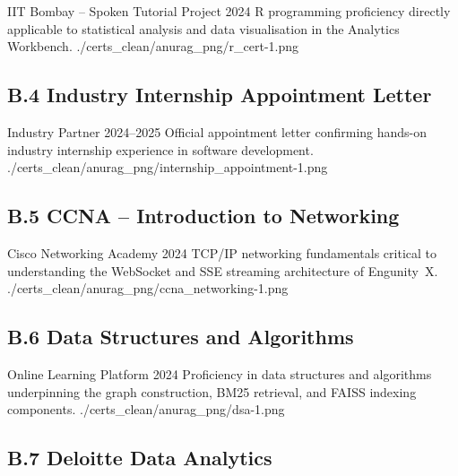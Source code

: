 \certentry
  {IIT Bombay -- Spoken Tutorial Project}
  {2024}
  {R programming proficiency directly applicable to statistical analysis and
   data visualisation in the Analytics Workbench.}
  {./certs_clean/anurag_png/r_cert-1.png}

\subsection*{B.4 \quad Industry Internship Appointment Letter}

\certentry
  {Industry Partner}
  {2024--2025}
  {Official appointment letter confirming hands-on industry internship experience
   in software development.}
  {./certs_clean/anurag_png/internship_appointment-1.png}

\subsection*{B.5 \quad CCNA -- Introduction to Networking}

\certentry
  {Cisco Networking Academy}
  {2024}
  {TCP/IP networking fundamentals critical to understanding the WebSocket and
   SSE streaming architecture of Engunity~X.}
  {./certs_clean/anurag_png/ccna_networking-1.png}

\subsection*{B.6 \quad Data Structures and Algorithms}

\certentry
  {Online Learning Platform}
  {2024}
  {Proficiency in data structures and algorithms underpinning the graph
   construction, BM25 retrieval, and FAISS indexing components.}
  {./certs_clean/anurag_png/dsa-1.png}

\subsection*{B.7 \quad Deloitte Data Analytics}

